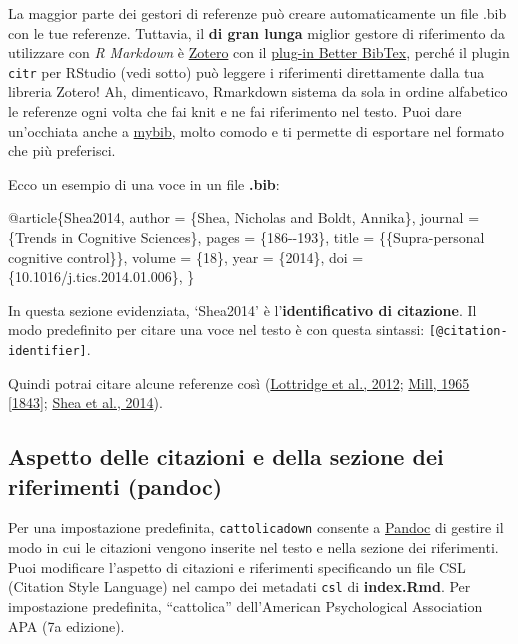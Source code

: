 \documentclass[a4paper, 11pt, nobind]{templates/ociamthesis}
\newenvironment{Shaded}{\begin{snugshade}}{\end{snugshade}}
\newcommand{\DataTypeTok}[1]{\textcolor[rgb]{0.13,0.29,0.53}{#1}}
\newcommand{\NormalTok}[1]{#1}
\newcommand{\OtherTok}[1]{\textcolor[rgb]{0.56,0.35,0.01}{#1}}
\newcommand{\VariableTok}[1]{\textcolor[rgb]{0.00,0.00,0.00}{#1}}
\renewenvironment{Shaded}
{
  \vspace{10pt}%
  \begin{snugshade}%
}{%
  \end{snugshade}%
  \vspace{8pt}%
}
\begin{document}
La maggior parte dei gestori di referenze può creare automaticamente un file .bib con le tue referenze.
Tuttavia, il \textbf{di gran lunga} miglior gestore di riferimento da utilizzare con \emph{R Markdown} è \href{https://www.zotero.org}{Zotero} con il \href{https://retorque.\%20re/zotero-better-bibtex/}{plug-in Better BibTex}, perché il plugin \texttt{citr} per RStudio (vedi sotto) può leggere i riferimenti direttamente dalla tua libreria Zotero!
Ah, dimenticavo, Rmarkdown sistema da sola in ordine alfabetico le referenze ogni volta che fai knit e ne fai riferimento nel testo. Puoi dare un'occhiata anche a \href{https://www.mybib.com/\#/}{mybib}, molto comodo e ti permette di esportare nel formato che più preferisci.

Ecco un esempio di una voce in un file \textbf{.bib}:

\begin{Shaded}
\begin{Highlighting}[]
\VariableTok{@article}\NormalTok{\{}\OtherTok{Shea2014}\NormalTok{,}
  \DataTypeTok{author}\NormalTok{ =        \{Shea, Nicholas and Boldt, Annika\},}
  \DataTypeTok{journal}\NormalTok{ =       \{Trends in Cognitive Sciences\},}
  \DataTypeTok{pages}\NormalTok{ =         \{186{-}{-}193\},}
  \DataTypeTok{title}\NormalTok{ =         \{\{Supra{-}personal cognitive control\}\},}
  \DataTypeTok{volume}\NormalTok{ =        \{18\},}
  \DataTypeTok{year}\NormalTok{ =          \{2014\},}
  \DataTypeTok{doi}\NormalTok{ =           \{10.1016/j.tics.2014.01.006\},}
\NormalTok{\}}
\end{Highlighting}
\end{Shaded}

In questa sezione evidenziata, `Shea2014' è l'\textbf{identificativo di citazione}.
Il modo predefinito per citare una voce nel testo è con questa sintassi: \texttt{{[}@citation-identifier{]}}.

Quindi potrai citare alcune referenze così (\protect\hyperlink{ref-Lottridge2012}{Lottridge et al., 2012}; \protect\hyperlink{ref-Mill1965}{Mill, 1965 {[}1843{]}}; \protect\hyperlink{ref-Shea2014}{Shea et al., 2014}).

\hypertarget{citation-appearance}{%
\subsection{Aspetto delle citazioni e della sezione dei riferimenti (pandoc)}\label{citation-appearance}}

Per una impostazione predefinita, \texttt{cattolicadown} consente a \href{https://pandoc.org}{Pandoc} di gestire il modo in cui le citazioni vengono inserite nel testo e nella sezione dei riferimenti.
Puoi modificare l'aspetto di citazioni e riferimenti specificando un file CSL (Citation Style Language) nel campo dei metadati \texttt{csl} di \textbf{index.Rmd}.
Per impostazione predefinita, ``cattolica'' dell'American Psychological Association APA (7a edizione).
\end{document}
